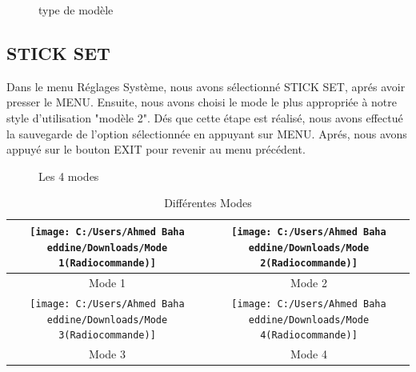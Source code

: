 	\begin{figure}[h]
		\begin{center}
			\centering
		\end{center}
		\caption{type de modèle}
	\end{figure}
	\subsection{STICK SET }
	Dans le menu Réglages Système, nous avons sélectionné STICK SET, aprés avoir presser le MENU. Ensuite, nous avons choisi le mode le plus appropriée à notre style d'utilisation "modèle 2". Dés que cette étape est réalisé, nous avons effectué la sauvegarde de l'option sélectionnée en appuyant sur MENU. Aprés, nous avons appuyé sur le bouton EXIT pour revenir au menu précédent.
	\begin{figure}[h]
		\begin{center}
			\centering
		\end{center}
		\caption{Les 4 modes}
	\end{figure}
	\newpage
	\begin{table}[h]
		\begin{center}
			\caption{Différentes Modes }
			\begin{tabular}{|c|c|}
				\hline
				
				\centering
				
				\texttt{[image: C:/Users/Ahmed Baha eddine/Downloads/Mode 1(Radiocommande)]} & \texttt{[image: C:/Users/Ahmed Baha eddine/Downloads/Mode 2(Radiocommande)]}\\
				\hline
				\centering
				
				Mode 1 & Mode 2 \\
				
				\hline
				\centering
				\texttt{[image: C:/Users/Ahmed Baha eddine/Downloads/Mode 3(Radiocommande)]}& \texttt{[image: C:/Users/Ahmed Baha eddine/Downloads/Mode 4(Radiocommande)]}\\
				\hline
				\centering
				
				Mode 3 &  Mode 4 \\
				\hline
			\end{tabular}
		\end{center}
	\end{table}
	
